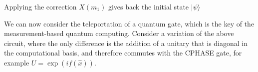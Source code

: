 \documentclass[reprint,
superscriptaddress,
 amsmath,amssymb,
 aps,
prb,
]{revtex4-1}
\newcommand{\ket}[1]{|{#1}\rangle}
\begin{document}
Applying the correction $X(m_1)$ gives back the initial state $\ket{\psi}$


We can now consider the teleportation of a quantum gate, which is the key of the measurement-based quantum computing.
Consider a variation of the above circuit, where the only difference is the addition of a unitary that is diagonal 
in the computational basis, and therefore commutes with the CPHASE gate, for example $U=\exp(i f(\hat x))$. 
\end{document}
